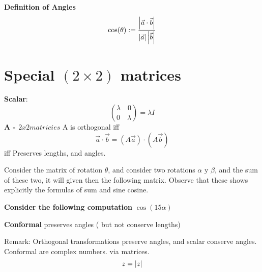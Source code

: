 \textbf{Definition of Angles }
\[ \cos(\theta) := \frac{\left| \vec{a} \cdot \vec{b} \right|}{\left| \vec{a} \right| \left|  \vec{b} \right|}\]

\section{Special $ (2 \times 2 ) $ matrices}

\textbf{Scalar}: 
\[ \binom{ \lambda \quad 0}{0 \quad \lambda } = \lambda I \]
\textbf{A - $ 2 x 2 matricies$}
A is orthogonal iff
\[ \vec{a} \cdot \vec{b} = (A \vec{a}) \cdot (A \vec{b}) \] iff
Preserves lengths, and angles.

Consider the matrix of rotation $ \theta $, and consider two rotations  $ \alpha $ y $ \beta $, and the sum of these two, it will given then the following matrix.
Observe that these shows explicitly the formulas of sum and sine cosine.

\textbf{Consider the following computation} $ \cos(15 \alpha) $

\begin{define}
	\textbf{Conformal} preserves angles ( but not conserve lengths)
\end{define}

Remark: Orthogonal transformations preserve angles, and scalar conserve angles.
Conformal are complex numbers. via matrices. 
\[ z = \left| z \right|  \]